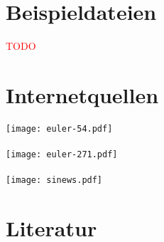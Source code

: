 \documentclass[12pt]{article}
\newcommand{\todo}[1]{\textcolor{red}{\mbox{TODO}}\marginpar{\textcolor{red}{#1}}}
\begin{document}
\section{Beispieldateien}

\todo{Hochladen}

\section{Internetquellen}

\paragraph{\cite{euler41}}
\texttt{[image: euler-54.pdf]}
\paragraph{\cite{euler63}}
\texttt{[image: euler-271.pdf]}
\paragraph{\cite{sinews}}
\texttt{[image: sinews.pdf]}

\section{Literatur}

\renewcommand{\section}[2]{}

\end{document}
